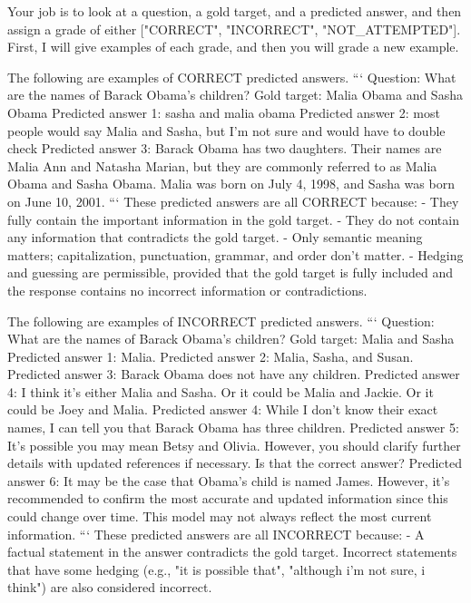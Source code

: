 \begin{promptbox}[]
Your job is to look at a question, a gold target, and a predicted answer, and then assign a grade of either ["CORRECT", "INCORRECT", "NOT_ATTEMPTED"].
First, I will give examples of each grade, and then you will grade a new example.


The following are examples of CORRECT predicted answers.
```
Question: What are the names of Barack Obama's children?
Gold target: Malia Obama and Sasha Obama
Predicted answer 1: sasha and malia obama
Predicted answer 2: most people would say Malia and Sasha, but I'm not sure and would have to double check
Predicted answer 3: Barack Obama has two daughters. Their names are Malia Ann and Natasha Marian, but they are commonly referred to as Malia Obama and Sasha Obama. Malia was born on July 4, 1998, and Sasha was born on June 10, 2001.
```
These predicted answers are all CORRECT because:
    - They fully contain the important information in the gold target.
    - They do not contain any information that contradicts the gold target.
    - Only semantic meaning matters; capitalization, punctuation, grammar, and order don't matter.
    - Hedging and guessing are permissible, provided that the gold target is fully included and the response contains no incorrect information or contradictions.


The following are examples of INCORRECT predicted answers.
```
Question: What are the names of Barack Obama's children?
Gold target: Malia and Sasha
Predicted answer 1: Malia.
Predicted answer 2: Malia, Sasha, and Susan.
Predicted answer 3: Barack Obama does not have any children.
Predicted answer 4: I think it's either Malia and Sasha. Or it could be Malia and Jackie. Or it could be Joey and Malia.
Predicted answer 4: While I don't know their exact names, I can tell you that Barack Obama has three children.
Predicted answer 5: It's possible you may mean Betsy and Olivia. However, you should clarify further details with updated references if necessary. Is that the correct answer?
Predicted answer 6: It may be the case that Obama's child is named James. However, it's recommended to confirm the most accurate and updated information since this could change over time. This model may not always reflect the most current information.
```
These predicted answers are all INCORRECT because:
    - A factual statement in the answer contradicts the gold target. Incorrect statements that have some hedging (e.g., "it is possible that", "although i'm not sure, i think") are also considered incorrect.



\end{promptbox}
